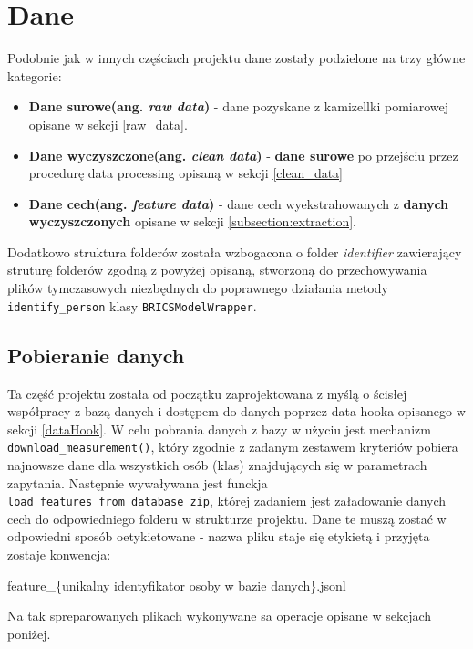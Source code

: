 \section{Dane} %
Podobnie jak w innych częściach projektu dane zostały podzielone na trzy główne kategorie:
\begin{itemize}
    \item {
        \textbf{Dane surowe(ang. \textit{raw data})} - dane pozyskane z kamizellki pomiarowej
         opisane w sekcji \ref{raw_data}.
        }
    \item {
        \textbf{Dane wyczyszczone(ang. \textit{clean data})} - \textbf{dane surowe} po przejściu 
        przez procedurę data processing opisaną w sekcji \ref{clean_data}
        }
    \item {
        \textbf{Dane cech(ang. \textit{feature data})} - dane cech wyekstrahowanych z 
        \textbf{danych wyczyszczonych} opisane w sekcji \ref{subsection:extraction}.
        }
\end{itemize}

Dodatkowo struktura folderów została wzbogacona o folder \textit{identifier} zawierający struturę
folderów zgodną z powyżej opisaną, stworzoną do przechowywania plików tymczasowych niezbędnych do 
poprawnego działania metody \verb|identify_person| klasy \verb|BRICSModelWrapper|.

\subsection{Pobieranie danych}
Ta część projektu została od początku zaprojektowana z myślą o ścisłej współpracy z bazą danych
i dostępem do danych poprzez data hooka opisanego w sekcji \ref{dataHook}. W celu pobrania danych
z bazy w użyciu jest mechanizm \verb|download_measurement()|, który zgodnie z zadanym
zestawem kryteriów pobiera najnowsze dane dla wszystkich osób (klas) znajdujących się
w parametrach zapytania. Następnie wywaływana jest funckja \verb|load_features_from_database_zip|,
której zadaniem jest załadowanie danych cech do odpowiedniego folderu w strukturze projektu.
Dane te muszą zostać w odpowiedni sposób oetykietowane - nazwa pliku staje się etykietą i 
przyjęta zostaje konwencja:
\begin{center}
    feature\_\{unikalny identyfikator osoby w bazie danych\}.jsonl
\end{center}
Na tak spreparowanych plikach wykonywane sa operacje opisane w sekcjach poniżej.

